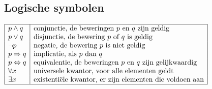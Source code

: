 \documentclass[a5paper]{article}
\begin{document}
\subsection{Logische symbolen}
$
\begin{array}{|l|l|}
\hline
p \land q & \text{conjunctie, de beweringen } p \text{ en } q \text{ zijn geldig} \\
p \lor q & \text{disjunctie, de bewering } p \text{ of } q \text{ is geldig} \\
\lnot p & \text{negatie, de bewering } p \text{ is niet geldig} \\
p \Rightarrow q & \text{implicatie, als } p \text{ dan } q \\
p \Leftrightarrow q & \text{equivalentie, de beweringen } p \text{ en } q \text{ zijn gelijkwaardig} \\
\forall x & \text{universele kwantor, voor alle elementen geldt} \\
\exists x & \text{existentiële kwantor, er zijn elementen die voldoen aan} \\
\hline
\end{array}
$
\end{document}
